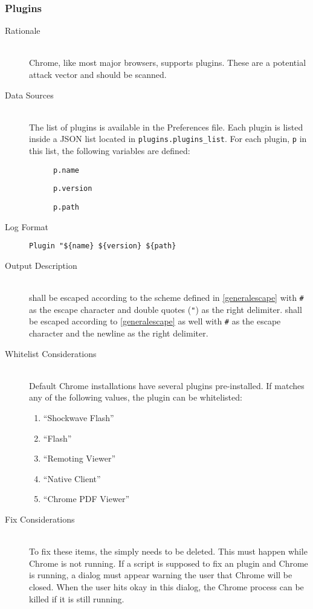 \subsubsection{Plugins}
\begin{description}
\item[Rationale] \hfill \\
Chrome, like most major browsers, supports plugins.  These are a potential
attack vector and should be scanned.
\item[Data Sources] \hfill \\
The list of plugins is available in the Preferences file.  Each plugin is listed
inside a JSON list located in \verb|plugins.plugins_list|.  For each plugin,
\texttt{p} in this list, the following variables are defined:
\begin{description}
\item[] \texttt{p.name}
\item[] \texttt{p.version}
\item[] \texttt{p.path}
\end{description}
\item[Log Format] \hfill
\vspace{-\baselineskip}
\begin{verbatim}
Plugin "${name} ${version} ${path}
\end{verbatim}
\item[Output Description] \hfill \\
 shall be escaped according to the scheme defined in
\ref{generalescape} with \verb|#| as the escape character and double quotes
(\verb|"|) as the right delimiter.   shall be escaped according to
\ref{generalescape} as well with \verb|#| as the escape character and the
newline as the right delimiter.
\item[Whitelist Considerations] \hfill \\
Default Chrome installations have several plugins pre-installed.  If 
matches any of the following values, the plugin can be whitelisted:
\begin{enumerate}
  \item ``Shockwave Flash''
  \item ``Flash''
  \item ``Remoting Viewer''
  \item ``Native Client''
  \item ``Chrome PDF Viewer''
\end{enumerate}
\item[Fix Considerations] \hfill \\
To fix these items, the  simply needs to be deleted.  This must
happen while Chrome is not running.  If a script is supposed to fix an
plugin and Chrome is running, a dialog must appear warning the user that
Chrome will be closed.  When the user hits okay in this dialog, the Chrome
process can be killed if it is still running.  
\end{description}

